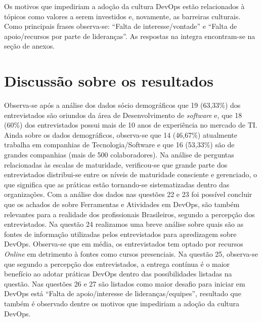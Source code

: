 \documentclass[twoside,english,brazilian]{UNISINOSartigo}
\begin{document}
Os motivos que impediriam a adoção da cultura DevOps estão relacionados à tópicos como valores a serem investidos e, novamente, as barreiras culturais. Como principais frases observa-se: ``Falta de interesse/vontade'' e ``Falta de apoio/recursos por parte de lideranças''. As respostas na integra encontram-se na seção de anexos.

\section{Discussão sobre os resultados}
Observa-se após a análise dos dados sócio demográficos que 19 (63,33\%) dos entrevistados são oriundos da área de Desenvolvimento de \textit{software} e, que 18 (60\%) dos entrevistados possui mais de 10 anos de experiência no mercado de TI. Ainda sobre os dados demográficos, observa-se que 14 (46,67\%) atualmente trabalha em companhias de Tecnologia/Software e que 16 (53,33\%) são de grandes companhias (mais de 500 colaboradores).
Na análise de perguntas relacionadas às escalas de maturidade, verificou-se que grande parte dos entrevistados distribui-se entre os níveis de maturidade consciente e gerenciado, o que significa que as práticas estão tornando-se sistematizadas dentro das organizações.
Com a análise dos dados nas questões 22 e 23 foi possível concluir que os achados de  sobre Ferramentas e Atividades em DevOps, são também relevantes para a realidade dos profissionais Brasileiros, segundo a percepção dos entrevistados. 
Na questão 24 realizamos uma breve análise sobre quais são as fontes de informação utilizadas pelos entrevistados para apredizagem sobre DevOps. Observa-se que em média, os entrevistados tem optado por recursos \textit{Online} em detrimento à fontes como cursos presenciais.
Na questão 25, observa-se que segundo a percepção dos entrevistados, a entrega contínua é o maior benefício ao adotar práticas DevOps dentro das possibilidades listadas na questão. 
Nas questões 26 e 27 são listados como maior desafio para iniciar em DevOps está ``Falta de apoio/interesse de lideranças/equipes'', resultado que também é observado dentre os motivos que impediriam a adoção da cultura DevOps. 
\end{document}
